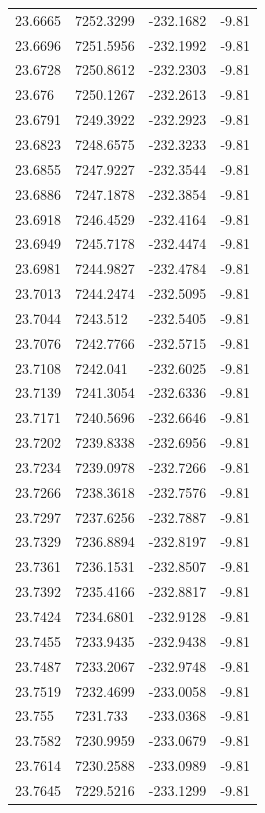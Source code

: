 \begin{table}[H]
\begin{tabular}{llll}
23.6665 & 7252.3299 & -232.1682 & -9.81 \\
23.6696 & 7251.5956 & -232.1992 & -9.81 \\
23.6728 & 7250.8612 & -232.2303 & -9.81 \\
23.676 & 7250.1267 & -232.2613 & -9.81 \\
23.6791 & 7249.3922 & -232.2923 & -9.81 \\
23.6823 & 7248.6575 & -232.3233 & -9.81 \\
23.6855 & 7247.9227 & -232.3544 & -9.81 \\
23.6886 & 7247.1878 & -232.3854 & -9.81 \\
23.6918 & 7246.4529 & -232.4164 & -9.81 \\
23.6949 & 7245.7178 & -232.4474 & -9.81 \\
23.6981 & 7244.9827 & -232.4784 & -9.81 \\
23.7013 & 7244.2474 & -232.5095 & -9.81 \\
23.7044 & 7243.512 & -232.5405 & -9.81 \\
23.7076 & 7242.7766 & -232.5715 & -9.81 \\
23.7108 & 7242.041 & -232.6025 & -9.81 \\
23.7139 & 7241.3054 & -232.6336 & -9.81 \\
23.7171 & 7240.5696 & -232.6646 & -9.81 \\
23.7202 & 7239.8338 & -232.6956 & -9.81 \\
23.7234 & 7239.0978 & -232.7266 & -9.81 \\
23.7266 & 7238.3618 & -232.7576 & -9.81 \\
23.7297 & 7237.6256 & -232.7887 & -9.81 \\
23.7329 & 7236.8894 & -232.8197 & -9.81 \\
23.7361 & 7236.1531 & -232.8507 & -9.81 \\
23.7392 & 7235.4166 & -232.8817 & -9.81 \\
23.7424 & 7234.6801 & -232.9128 & -9.81 \\
23.7455 & 7233.9435 & -232.9438 & -9.81 \\
23.7487 & 7233.2067 & -232.9748 & -9.81 \\
23.7519 & 7232.4699 & -233.0058 & -9.81 \\
23.755 & 7231.733 & -233.0368 & -9.81 \\
23.7582 & 7230.9959 & -233.0679 & -9.81 \\
23.7614 & 7230.2588 & -233.0989 & -9.81 \\
23.7645 & 7229.5216 & -233.1299 & -9.81 \\

\end{tabular}
\end{table}
